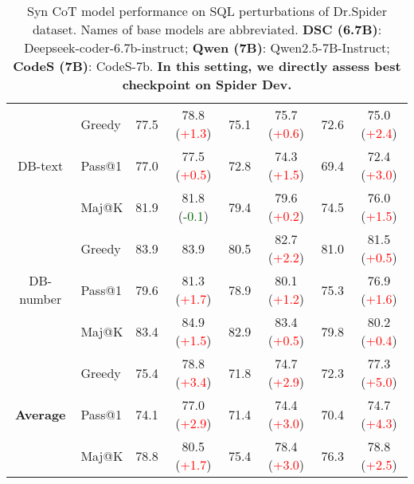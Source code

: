 \begin{table*}[t!]
\begin{adjustbox}{max width=\textwidth}
\begin{tabular}{c | l | c c | c c | c c }
        \multirow{3}{*}{DB-text} & Greedy & 77.5 & 78.8 (\textcolor{red}{+1.3}) & 75.1 & 75.7 (\textcolor{red}{+0.6}) & 72.6 & 75.0 (\textcolor{red}{+2.4}) \\
& Pass@1 & 77.0 & 77.5 (\textcolor{red}{+0.5}) & 72.8 & 74.3 (\textcolor{red}{+1.5}) & 69.4 & 72.4 (\textcolor{red}{+3.0}) \\
& Maj@K & 81.9 & 81.8 (\textcolor{darkgreen}{-0.1}) & 79.4 & 79.6 (\textcolor{red}{+0.2}) & 74.5 & 76.0 (\textcolor{red}{+1.5}) \\
 \midrule

        \multirow{3}{*}{DB-number} & Greedy & 83.9 & 83.9 \phantom{(+0.3)} & 80.5 & 82.7 (\textcolor{red}{+2.2}) & 81.0 & 81.5 (\textcolor{red}{+0.5}) \\
& Pass@1 & 79.6 & 81.3 (\textcolor{red}{+1.7}) & 78.9 & 80.1 (\textcolor{red}{+1.2}) & 75.3 & 76.9 (\textcolor{red}{+1.6}) \\
& Maj@K & 83.4 & 84.9 (\textcolor{red}{+1.5}) & 82.9 & 83.4 (\textcolor{red}{+0.5}) & 79.8 & 80.2 (\textcolor{red}{+0.4}) \\
 \midrule

        \multirow{3}{*}{\textbf{Average}} & Greedy & 75.4 & 78.8 (\textcolor{red}{+3.4}) & 71.8 & 74.7 (\textcolor{red}{+2.9}) & 72.3 & 77.3 (\textcolor{red}{+5.0}) \\
& Pass@1 & 74.1 & 77.0 (\textcolor{red}{+2.9}) & 71.4 & 74.4 (\textcolor{red}{+3.0}) & 70.4 & 74.7 (\textcolor{red}{+4.3}) \\
& Maj@K & 78.8 & 80.5 (\textcolor{red}{+1.7}) & 75.4 & 78.4 (\textcolor{red}{+3.0}) & 76.3 & 78.8 (\textcolor{red}{+2.5}) \\

        
        \bottomrule
    \end{tabular}
\end{adjustbox}
    \caption{Syn CoT model performance on SQL perturbations of Dr.Spider dataset. Names of base models are abbreviated. \textbf{DSC (6.7B)}: Deepseek-coder-6.7b-instruct; \textbf{Qwen (7B)}: Qwen2.5-7B-Instruct; \textbf{CodeS (7B)}: CodeS-7b. \textbf{In this setting, we directly assess best checkpoint on Spider Dev.}} 
    \label{tab:drSpiderSQLCoT}
\end{table*}

